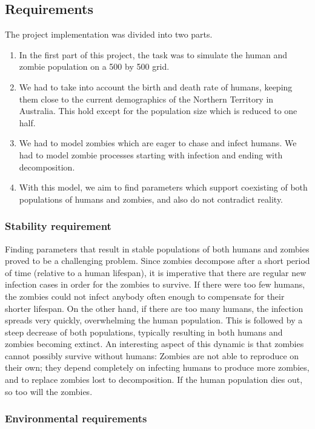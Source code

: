 \documentclass[a4paper]{article}
\begin{document}
\subsection{Requirements}

The project implementation was divided into two parts.

\begin{enumerate}
\item In the first part of this project, the task was to simulate the human and zombie population on a 500 by 500 grid.
\item We had to take into account the birth and death rate of humans, keeping them close to the current demographics of the Northern Territory in Australia.
    This hold except for the population size which is reduced to one half. \cite{project}
\item We had to model zombies which are eager to chase and infect humans.
    We had to model zombie processes starting with infection and ending with decomposition.
\item With this model, we aim to find parameters which support coexisting of both populations of humans and zombies, and also do not contradict reality.
\end{enumerate}

\subsubsection{Stability requirement}

Finding parameters that result in stable populations of both humans and zombies proved to be a challenging problem.
Since zombies decompose after a short period of time (relative to a human lifespan), it is imperative that there are regular new infection cases in order for the zombies to survive.
If there were too few humans, the zombies could not infect anybody often enough to compensate for their shorter lifespan.
On the other hand, if there are too many humans, the infection spreads very quickly, overwhelming the human population. 
This is followed by a steep decrease of both populations, typically resulting in both humans and zombies becoming extinct.
An interesting aspect of this dynamic is that zombies cannot possibly survive without humans: Zombies are not able to reproduce on their own; they depend completely on infecting humans to produce more zombies, and to replace zombies lost to decomposition. 
If the human population dies out, so too will the zombies.

\subsubsection{Environmental requirements}
\end{document}
